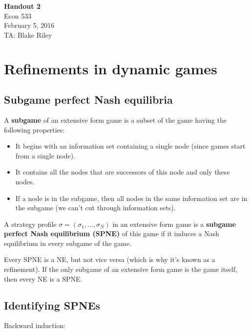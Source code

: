 \documentclass[10pt]{article}
\def\HandoutNumber{2}
\def\TheDate{February 5, 2016}
\def\Name{Blake Riley}
\begin{document}
\begin{spacing}{1.0}

\noindent
\textbf{Handout \HandoutNumber} \\
Econ 533 \\
\TheDate \\
TA: \Name \\

\section{Refinements in dynamic games}

\subsection{Subgame perfect Nash equilibria}

\begin{definition}
  A \textbf{subgame} of an extensive form game is a subset of the
  game having the following properties:
  \begin{itemize}
  \item It begins with an information set containing a
    single node (since games start from a single node).
  \item It contains all the nodes that are successors of
    this node and only these nodes.
  \item If a node is in the subgame, then all nodes in
    the same information set are in the subgame (we can't
    cut through information sets).
  \end{itemize}
\end{definition}

\begin{definition}
  A strategy profile $\sigma = (\sigma_1, \ldots, \sigma_N)$ in an
  extensive form game is a \textbf{subgame perfect Nash equilibrium (SPNE)}
  of this game if it induces a Nash equilibrium in every subgame of the
  game.
\end{definition}

Every SPNE is a NE, but not vice versa (which is why it's known as a
refinement). If the only subgame of an extensive form game is the game
itself, then every NE is a SPNE.

\subsection{Identifying SPNEs}

Backward induction:


\end{spacing}
\end{document}
